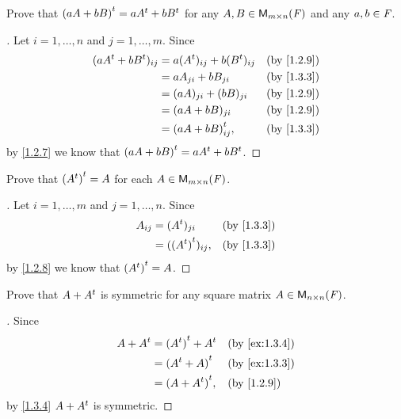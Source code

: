 \exercisesection

\setcounter{ex}{2}
\begin{ex}\label{ex:1.3.3}
	Prove that \({(aA + bB)}^{t} = a{A}^{t} + b{B}^{t}\) for any \(A, B \in \ms[m][n][\F]\) and any \(a, b \in \mathit{F}\).
\end{ex}

\begin{proof}[]
	Let \(i = 1, \dots, n\) and \(j = 1, \dots, m\).
	Since
	\begin{align*}
		(a\tp{A} + b\tp{B})_{i j} & = a(\tp{A})_{i j} + b(\tp{B})_{i j} &  & \by{1.2.9} \\
		                          & = aA_{j i} + bB_{j i}               &  & \by{1.3.3} \\
		                          & = (aA)_{j i} + (bB)_{j i}           &  & \by{1.2.9} \\
		                          & = (aA + bB)_{j i}                   &  & \by{1.2.9} \\
		                          & = \tp{(aA + bB)}_{i j},             &  & \by{1.3.3}
	\end{align*}
	by \cref{1.2.7} we know that \({(aA + bB)}^{t} = a{A}^{t} + b{B}^{t}\).
\end{proof}

\begin{ex}\label{ex:1.3.4}
	Prove that \({({A}^{t})}^{t} = A\) for each \(A \in \MS\).
\end{ex}

\begin{proof}[]
	Let \(i = 1, \dots, m\) and \(j = 1, \dots, n\).
	Since
	\begin{align*}
		A_{i j} & = (\tp{A})_{j i}         &  & \by{1.3.3} \\
		        & = (\tp{(\tp{A})})_{i j}, &  & \by{1.3.3}
	\end{align*}
	by \cref{1.2.8} we know that \({({A}^{t})}^{t} = A\).
\end{proof}

\begin{ex}\label{ex:1.3.5}
	Prove that \(A + {A}^{t}\) is symmetric for any square matrix \(A \in \ms[n][n][\F]\).
\end{ex}

\begin{proof}[]
	Since
	\begin{align*}
		A + \tp{A} & = \tp{(\tp{A})} + \tp{A} &  & \by{ex:1.3.4} \\
		           & = \tp{(\tp{A} + A)}      &  & \by{ex:1.3.3} \\
		           & = \tp{(A + \tp{A})},     &  & \by{1.2.9}
	\end{align*}
	by \cref{1.3.4} \(A + {A}^{t}\) is symmetric.
\end{proof}

